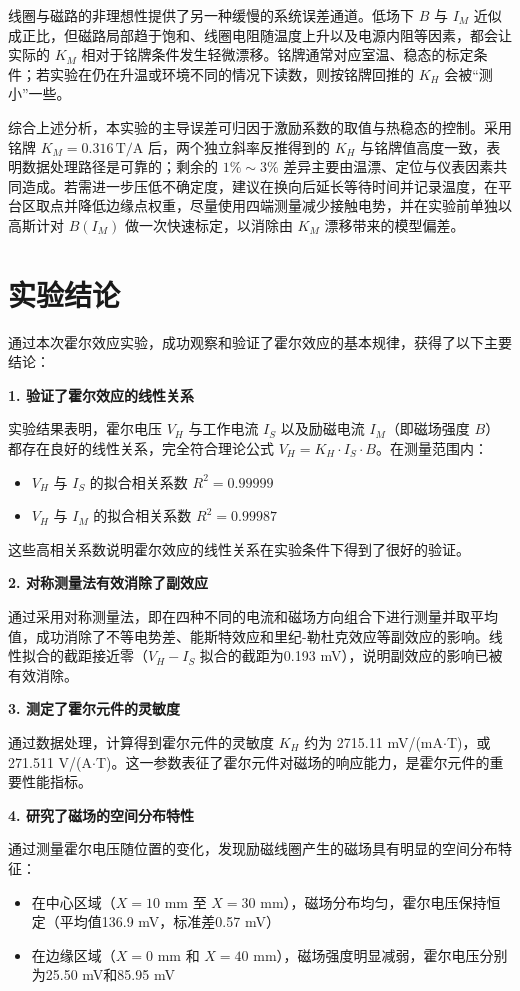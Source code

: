 ﻿\documentclass[12pt,a4paper]{article}
\begin{document}
线圈与磁路的非理想性提供了另一种缓慢的系统误差通道。低场下 $B$ 与 $I_M$ 近似成正比，但磁路局部趋于饱和、线圈电阻随温度上升以及电源内阻等因素，都会让实际的 $K_M$ 相对于铭牌条件发生轻微漂移。铭牌通常对应室温、稳态的标定条件；若实验在仍在升温或环境不同的情况下读数，则按铭牌回推的 $K_H$ 会被“测小”一些。

综合上述分析，本实验的主导误差可归因于激励系数的取值与热稳态的控制。采用铭牌 $K_M=0.316\,\mathrm{T/A}$ 后，两个独立斜率反推得到的 $K_H$ 与铭牌值高度一致，表明数据处理路径是可靠的；剩余的 $1\%\!\sim\!3\%$ 差异主要由温漂、定位与仪表因素共同造成。若需进一步压低不确定度，建议在换向后延长等待时间并记录温度，在平台区取点并降低边缘点权重，尽量使用四端测量减少接触电势，并在实验前单独以高斯计对 $B(I_M)$ 做一次快速标定，以消除由 $K_M$ 漂移带来的模型偏差。

\section{实验结论}

通过本次霍尔效应实验，成功观察和验证了霍尔效应的基本规律，获得了以下主要结论：

\textbf{1. 验证了霍尔效应的线性关系}

实验结果表明，霍尔电压 $V_H$ 与工作电流 $I_S$ 以及励磁电流 $I_M$（即磁场强度 $B$）都存在良好的线性关系，完全符合理论公式 $V_H = K_H \cdot I_S \cdot B$。在测量范围内：
\begin{itemize}
    \item $V_H$ 与 $I_S$ 的拟合相关系数 $R^2 = 0.99999$
    \item $V_H$ 与 $I_M$ 的拟合相关系数 $R^2 = 0.99987$
\end{itemize}

这些高相关系数说明霍尔效应的线性关系在实验条件下得到了很好的验证。

\textbf{2. 对称测量法有效消除了副效应}

通过采用对称测量法，即在四种不同的电流和磁场方向组合下进行测量并取平均值，成功消除了不等电势差、能斯特效应和里纪-勒杜克效应等副效应的影响。线性拟合的截距接近零（$V_H - I_S$ 拟合的截距为0.193 mV），说明副效应的影响已被有效消除。

\textbf{3. 测定了霍尔元件的灵敏度}

通过数据处理，计算得到霍尔元件的灵敏度 $K_H$ 约为 2715.11 mV/(mA$\cdot$T)，或 271.511 V/(A$\cdot$T)。这一参数表征了霍尔元件对磁场的响应能力，是霍尔元件的重要性能指标。

\textbf{4. 研究了磁场的空间分布特性}

通过测量霍尔电压随位置的变化，发现励磁线圈产生的磁场具有明显的空间分布特征：
\begin{itemize}
    \item 在中心区域（$X = 10$ mm 至 $X = 30$ mm），磁场分布均匀，霍尔电压保持恒定（平均值136.9 mV，标准差0.57 mV）
    \item 在边缘区域（$X = 0$ mm 和 $X = 40$ mm），磁场强度明显减弱，霍尔电压分别为25.50 mV和85.95 mV
\end{itemize}
\end{document}
